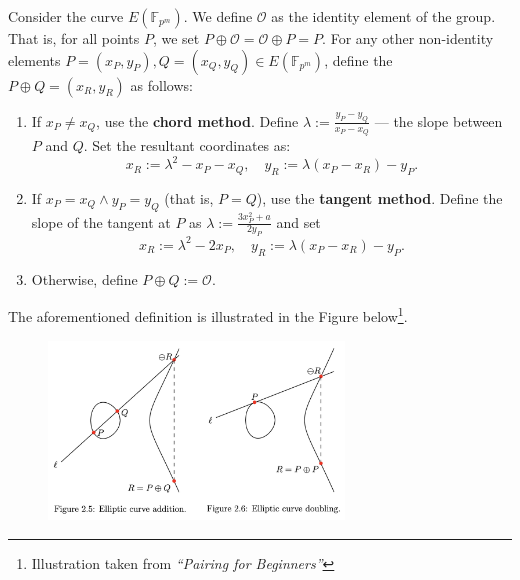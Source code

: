 \documentclass[../lecture-notes.tex]{subfiles}
\begin{document}
\begin{definition}
    Consider the curve $E(\mathbb{F}_{p^m})$. We define $\mathcal{O}$ as the identity element of the group. That is, for all points $P$, we set $P \oplus \mathcal{O} = \mathcal{O} \oplus P = P$. For any other non-identity elements $P=(x_P,y_P),Q=(x_Q,y_Q) \in E(\mathbb{F}_{p^m})$, define the $P\oplus Q = (x_R,y_R)$ as follows:
    \begin{enumerate}
        \item If $x_P\neq x_Q$, use the \textbf{chord method}. Define $\lambda := \frac{y_P-y_Q}{x_P-x_Q}$ --- the slope between $P$ and $Q$. Set the resultant coordinates as:
        \begin{equation}
            x_R := \lambda^2 - x_P - x_Q, \quad y_R := \lambda(x_P-x_R)-y_P.
        \end{equation}
        \item If $x_P=x_Q \wedge y_P=y_Q$ (that is, $P=Q$), use the \textbf{tangent method}. Define the slope of the tangent at $P$ as $\lambda := \frac{3x_P^2+a}{2y_P}$ and set
        \begin{equation}
            x_R := \lambda^2 - 2x_P, \quad y_R := \lambda(x_P-x_R)-y_P.
        \end{equation}
        \item Otherwise, define $P \oplus Q := \mathcal{O}$.
    \end{enumerate}
\end{definition}

The aforementioned definition is illustrated in the Figure below\footnote{Illustration taken from \textit{``Pairing for Beginners''}}.

\begin{figure}[H]
    \centering
    \includegraphics[width=0.7\textwidth]{images/lecture_3/group_law.png}
    \label{fig:group_law}
\end{figure}
\end{document}
